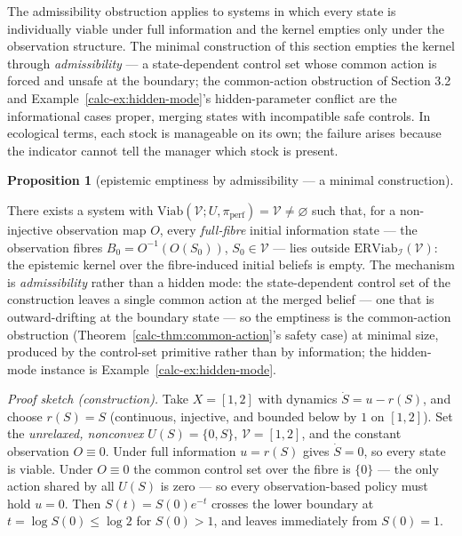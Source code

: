 \documentclass[10pt,twocolumn]{article}
\theoremstyle{definition}
\newtheorem{proposition}{Proposition}
\begin{document}
The admissibility obstruction applies to systems in which every state is
individually viable under full information and the kernel empties only under the observation structure.
The minimal construction of this section empties the kernel through
\emph{admissibility} --- a state-dependent control set whose common
action is forced and unsafe at the boundary; the common-action
obstruction of Section 3.2 and Example~\ref{calc-ex:hidden-mode}'s hidden-parameter
conflict are the informational cases proper, merging states with
incompatible safe controls. In ecological terms, each stock is manageable on its own; the failure arises because the indicator cannot tell the manager which stock is present.

\begin{proposition}[epistemic emptiness by admissibility --- a minimal construction]\label{calc-prop:emptiness}

There exists a system with
\(\mathrm{Viab}(\mathcal{V}; U, \pi_{\mathrm{perf}}) = \mathcal{V} \neq \varnothing\)
such that, for a non-injective observation map \(O\), every \emph{full-fibre} initial information state --- the observation fibres
\(B_0 = O^{-1}(O(S_0))\), \(S_0 \in \mathcal{V}\) --- lies outside
\(\mathrm{ERViab}_{\mathcal{I}}(\mathcal{V})\): the epistemic kernel
over the fibre-induced initial beliefs is empty. The mechanism is \emph{admissibility} rather than a hidden mode: the
state-dependent control set of the construction leaves a single common
action at the merged belief --- one that is outward-drifting at the
boundary state --- so the emptiness is the common-action obstruction
(Theorem~\ref{calc-thm:common-action}'s safety case) at minimal size, produced by the control-set primitive rather than by information; the
hidden-mode instance is Example~\ref{calc-ex:hidden-mode}.

\end{proposition}

\emph{Proof sketch (construction).} Take \(X = [1,2]\) with dynamics \(\dot S = u - r(S)\), and choose \(r(S)=S\) (continuous, injective, and bounded below by \(1\) on \([1,2]\)). Set the \emph{unrelaxed, nonconvex} \(U(S) = \{0, S\}\), \(\mathcal{V} = [1,2]\), and the constant observation \(O \equiv 0\). Under full information \(u = r(S)\) gives \(\dot S = 0\), so every state is viable. Under \(O \equiv 0\) the common control set over the fibre is \(\{0\}\) --- the only action shared by all \(U(S)\) is zero --- so every observation-based policy must hold \(u=0\). Then \(S(t)=S(0)e^{-t}\) crosses the lower boundary at \(t=\log S(0)\le\log 2\) for \(S(0)>1\), and leaves immediately from \(S(0)=1\).
\end{document}
